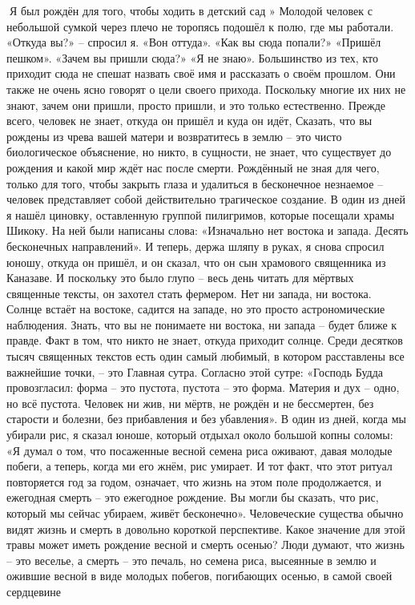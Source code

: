 \documentclass[a4paper]{book}
\begin{document}
Я был рождён для того, чтобы ходить в детский сад
»
Молодой человек с небольшой сумкой через плечо не торопясь подошёл к полю, где мы
работали.
«Откуда вы?» – спросил я.
«Вон оттуда».
«Как вы сюда попали?»
«Пришёл пешком».
«Зачем вы пришли сюда?»
«Я не знаю».
Большинство из тех, кто приходит сюда не спешат назвать своё имя и рассказать о своём
прошлом. Они также не очень ясно говорят о цели своего прихода. Поскольку многие их них
не знают, зачем они пришли, просто пришли, и это только естественно.
Прежде всего, человек не знает, откуда он пришёл и куда он идёт, Сказать, что вы
рождены из чрева вашей матери и возвратитесь в землю – это чисто биологическое
объяснение, но никто, в сущности, не знает, что существует до рождения и какой мир ждёт
нас после смерти. Рождённый не зная для чего, только для того, чтобы закрыть глаза и
удалиться в бесконечное незнаемое – человек представляет собой действительно
трагическое создание.
В один из дней я нашёл циновку, оставленную группой пилигримов, которые посещали
храмы Шикоку. На ней были написаны слова:
«Изначально нет востока и запада. Десять бесконечных направлений».
И теперь, держа шляпу в руках, я снова спросил юношу, откуда он пришёл, и он сказал,
что он сын храмового священника из Каназаве. И поскольку это было глупо – весь день
читать для мёртвых священные тексты, он захотел стать фермером.
Нет ни запада, ни востока. Солнце встаёт на востоке, садится на западе, но это просто
астрономические наблюдения. Знать, что вы не понимаете ни востока, ни запада – будет
ближе к правде. Факт в том, что никто не знает, откуда приходит солнце.
Среди десятков тысяч священных текстов есть один самый любимый, в котором
расставлены все важнейшие точки, – это Главная сутра. Согласно этой сутре: «Господь Будда
провозгласил: форма – это пустота, пустота – это форма. Материя и дух – одно, но всё
пустота. Человек ни жив, ни мёртв, не рождён и не бессмертен, без старости и болезни, без
прибавления и без убавления».
В один из дней, когда мы убирали рис, я сказал юноше, который отдыхал около большой
копны соломы: «Я думал о том, что посаженные весной семена риса оживают, давая
молодые побеги, а теперь, когда ми его жнём, рис умирает. И тот факт, что этот ритуал
повторяется год за годом, означает, что жизнь на этом поле продолжается, и ежегодная
смерть – это ежегодное рождение. Вы могли бы сказать, что рис, который мы сейчас
убираем, живёт бесконечно».
Человеческие существа обычно видят жизнь и смерть в довольно короткой перспективе.
Какое значение для этой травы может иметь рождение весной и смерть осенью? Люди
думают, что жизнь – это веселье, а смерть – это печаль, но семена риса, высеянные в землю
и ожившие весной в виде молодых побегов, погибающих осенью, в самой своей сердцевине
\end{document}
